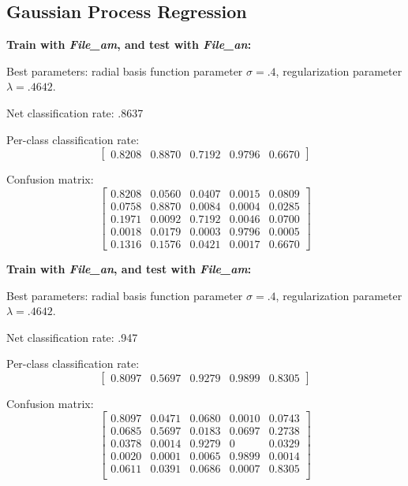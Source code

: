 \documentclass[letterpaper]{article}
\begin{document}
\subsection*{Gaussian Process Regression}

\textbf{Train with \textit{File\_am}, and test with \textit{File\_an}:}

Best parameters: radial basis function parameter $\sigma=.4$,
regularization parameter $\lambda=.4642$.

Net classification rate: .8637

Per-class classification rate: 
$$\begin{bmatrix}0.8208   & 0.8870  &  0.7192   & 0.9796 &   0.6670\end{bmatrix}$$

Confusion matrix:
$$\begin{bmatrix}
0.8208 &   0.0560  & 0.0407 &   0.0015  &  0.0809\\
    0.0758&    0.8870 &   0.0084&    0.0004 &   0.0285\\
    0.1971   & 0.0092   & 0.7192  &  0.0046   & 0.0700\\
    0.0018   & 0.0179    &0.0003  &  0.9796  &  0.0005\\
    0.1316   &0.1576    &0.0421  &  0.0017  &  0.6670
\end{bmatrix}$$

\textbf{Train with \textit{File\_an}, and test with \textit{File\_am}:}

Best parameters: radial basis function parameter $\sigma=.4$, regularization parameter $\lambda=.4642$.

Net classification rate: .947

Per-class classification rate: 
$$\begin{bmatrix}0.8097  &  0.5697   & 0.9279   & 0.9899  &  0.8305\end{bmatrix}$$

Confusion matrix:
$$\begin{bmatrix}
0.8097&    0.0471&    0.0680  &  0.0010  &  0.0743\\
    0.0685&    0.5697&    0.0183&    0.0697  &  0.2738\\
    0.0378   & 0.0014&    0.9279  &       0 &   0.0329\\
    0.0020 &   0.0001 &   0.0065 &   0.9899  &  0.0014\\
    0.0611   & 0.0391  &  0.0686  &  0.0007&    0.8305\\
\end{bmatrix}$$
\end{document}

